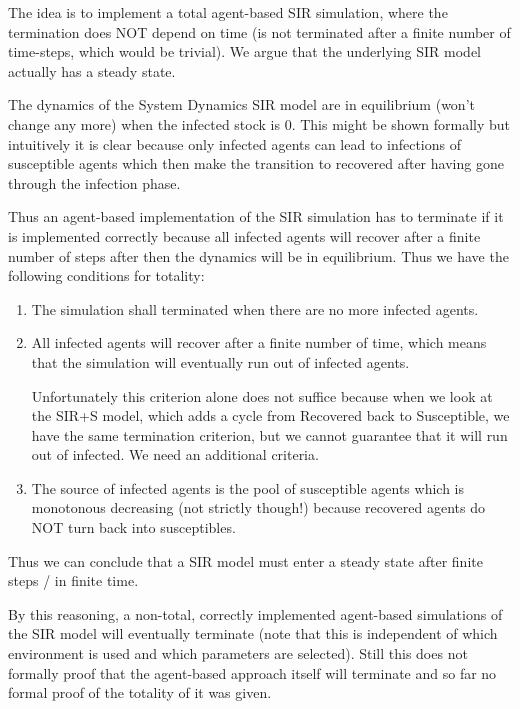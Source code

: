 The idea is to implement a total agent-based SIR simulation, where the termination does NOT depend on time (is not terminated after a finite number of time-steps, which would be trivial).  We argue that the underlying SIR model actually has a steady state.

The dynamics of the System Dynamics SIR model are in equilibrium (won't change any more) when the infected stock is 0. This might be shown formally but intuitively it is clear because only infected agents can lead to infections of susceptible agents which then make the transition to recovered after having gone through the infection phase. 

Thus an agent-based implementation of the SIR simulation has to terminate if it is implemented correctly because all infected agents will recover after a finite number of steps after then the dynamics will be in equilibrium. Thus we have the following conditions for totality:
\begin{enumerate}
	\item The simulation shall terminated when there are no more infected agents.
	\item All infected agents will recover after a finite number of time, which means that the simulation will eventually run out of infected agents. 
	
	Unfortunately this criterion alone does not suffice because when we look at the SIR+S model, which adds a cycle from Recovered back to Susceptible, we have the same termination criterion, but we cannot guarantee that it will run out of infected. We need an additional criteria.
	\item The source of infected agents is the pool of susceptible agents which is monotonous decreasing (not strictly though!) because recovered agents do NOT turn back into susceptibles.
\end{enumerate}

Thus we can conclude that a SIR model must enter a steady state after finite steps / in finite time. %

By this reasoning, a non-total, correctly implemented agent-based simulations of the SIR model will eventually terminate (note that this is independent of which environment is used and which parameters are selected). Still this does not formally proof that the agent-based approach itself will terminate and so far no formal proof of the totality of it was given.

